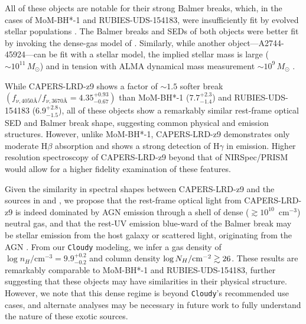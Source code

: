 \documentclass[twocolumn]{aastex7}
\newcommand{\src}{CAPERS-LRD-z9}
\begin{document}
All of these objects are notable for their strong Balmer breaks, which, in the cases of MoM-BH*-1 and RUBIES-UDS-154183, were insufficiently fit by evolved stellar populations \citep{naidu25,degraaff25}. The Balmer breaks and SEDs of both objects were better fit by invoking the dense-gas model of \citet{inayoshi25}. Similarly, while another object---A2744-45924---can be fit with a stellar model, the implied stellar mass is large ($\sim 10^{11}\,M_\odot$) and in tension with ALMA dynamical mass measurement $\sim 10^9\,M_\odot$ \citep{akins25b}. 

While \src{} shows a factor of $\sim1.5$ softer break $\left(f_{\nu,4050\textrm{\AA{}}}/f_{\nu,3670\textrm{\AA{}}}=4.35^{+0.93}_{-0.67}\right)$ than MoM-BH*-1 ($7.7^{+2.3}_{-1.4}$) and RUBIES-UDS-154183 ($6.9^{+2.8}_{-1.5}$), all of these objects show a remarkably similar rest-frame optical SED and Balmer break shape, suggesting common physical and emission structures. However, unlike MoM-BH*-1, \src{} demonstrates only moderate H$\beta$ absorption and shows a strong detection of H$\gamma$ in emission. Higher resolution spectroscopy of \src{} beyond that of NIRSpec/PRISM would allow for a higher fidelity examination of these features. 

Given the similarity in spectral shapes between \src{} and the sources in \cite{naidu25} and \cite{degraaff25}, we propose that the rest-frame optical light from \src{} is indeed dominated by AGN emission through a shell of dense ($\gtrsim10^{10}$~cm$^{-3}$) neutral gas, and that the rest-UV emission blue-ward of the Balmer break may be stellar emission from the host galaxy \citep[e.g.][]{kocevski23} or scattered light, originating from the AGN \citep[e.g.][]{greene24}. From our \texttt{Cloudy} modeling, we infer a gas density of $\log n_H/\textrm{cm}^{-3}=9.9^{+0.2}_{-0.2}$ and column density $\log N_H/{\rm cm}^{-2} \gtrsim 26$. These results are remarkably comparable to MoM-BH*-1 and RUBIES-UDS-154183, further suggesting that these objects may have similarities in their physical structure. However, we note that this dense regime is beyond \texttt{Cloudy}'s recommended use cases, and alternate analyses may be necessary in future work to fully understand the nature of these exotic sources.
\end{document}
